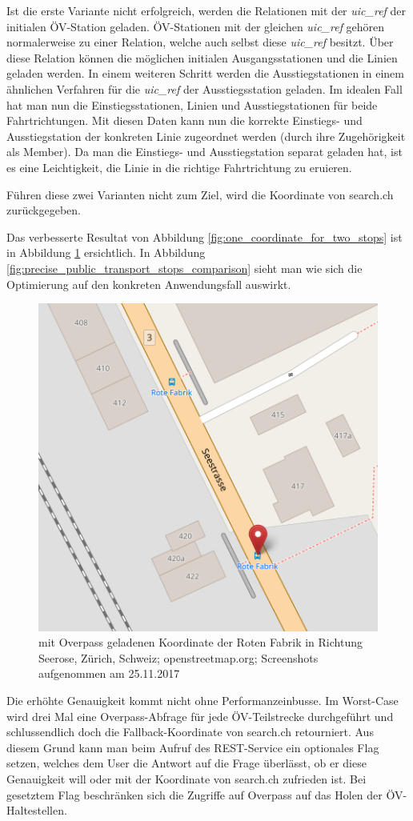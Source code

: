 Ist die erste Variante nicht erfolgreich, werden die Relationen mit der \emph{uic\_ref} der initialen ÖV-Station geladen. ÖV-Stationen mit der gleichen \emph{uic\_ref} gehören normalerweise zu einer Relation, welche auch selbst diese \emph{uic\_ref} besitzt. Über diese Relation können die möglichen initialen Ausgangsstationen und die Linien geladen werden. In einem weiteren Schritt werden die Ausstiegstationen in einem ähnlichen Verfahren für die \emph{uic\_ref} der Ausstiegsstation geladen. Im idealen Fall hat man nun die Einstiegsstationen, Linien und Ausstiegstationen für beide Fahrtrichtungen. Mit diesen Daten kann nun die korrekte Einstiegs- und Ausstiegstation der konkreten Linie zugeordnet werden (durch ihre Zugehörigkeit als Member). Da man die Einstiegs- und Ausstiegstation separat geladen hat, ist es eine Leichtigkeit, die Linie in die richtige Fahrtrichtung zu eruieren.

Führen diese zwei Varianten nicht zum Ziel, wird die Koordinate von search.ch zurückgegeben.

Das verbesserte Resultat von Abbildung \ref{fig:one_coordinate_for_two_stops} ist in Abbildung \ref{fig:one_coordinate_for_two_stops_improved} ersichtlich. In Abbildung \ref{fig:precise_public_transport_stops_comparison} sieht man wie sich die Optimierung auf den konkreten Anwendungsfall auswirkt.

\begin{figure}[ht]
    \centering
    \includegraphics[width=0.5\linewidth]{projectdoc/img/one_coordinate_for_two_stops_improved}
    \caption[mit Overpass geladenen Koordinate]{mit Overpass geladenen Koordinate der Roten Fabrik in Richtung Seerose, Zürich, Schweiz; openstreetmap.org; Screenshots aufgenommen am 25.11.2017}
    \label{fig:one_coordinate_for_two_stops_improved}
\end{figure}


Die erhöhte Genauigkeit kommt nicht ohne Performanzeinbusse. Im Worst-Case wird drei Mal eine Overpass-Abfrage \cite{wiki:overpass} für jede ÖV-Teilstrecke durchgeführt und schlussendlich doch die Fallback-Koordinate von search.ch \cite{search_ch_route_api} retourniert. Aus diesem Grund kann man beim Aufruf des \ac{REST}-Service ein optionales Flag setzen, welches dem User die Antwort auf die Frage überlässt, ob er diese Genauigkeit will oder mit der Koordinate von search.ch \cite{search_ch_route_api} zufrieden ist. Bei gesetztem Flag beschränken sich die Zugriffe auf Overpass \cite{wiki:overpass} auf das Holen der ÖV-Haltestellen.

